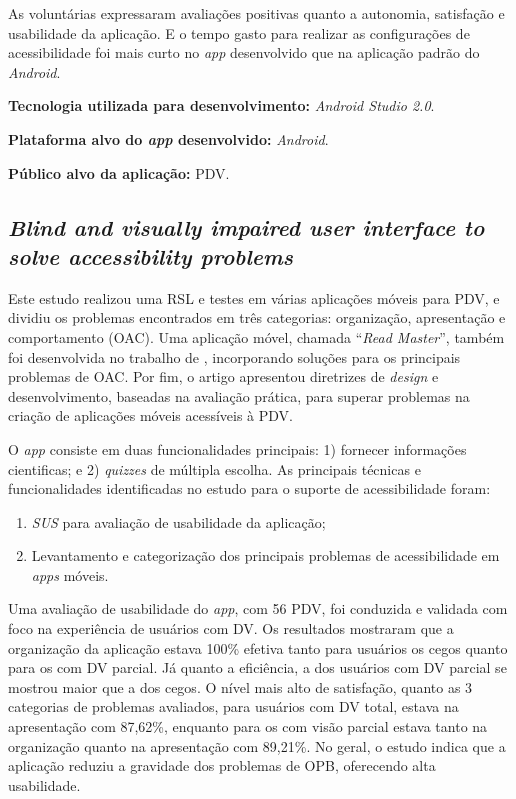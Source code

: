 As voluntárias expressaram avaliações positivas quanto a autonomia, satisfação e usabilidade da aplicação.
E o tempo gasto para realizar as configurações de acessibilidade foi mais curto no \emph{app} desenvolvido que na aplicação padrão do \emph{Android}.

\textbf{Tecnologia utilizada para desenvolvimento:} \emph{Android Studio 2.0}.

\textbf{Plataforma alvo do \emph{app} desenvolvido:} \emph{Android}.

\textbf{Público alvo da aplicação:} PDV\@.

\subsection{\emph{Blind and visually impaired user interface to solve accessibility problems}}

Este estudo realizou uma RSL e testes em várias aplicações móveis para PDV, e dividiu os problemas encontrados em três categorias: organização, apresentação e comportamento (OAC).
Uma aplicação móvel, chamada ``\emph{Read Master}'', também foi desenvolvida no trabalho de , incorporando soluções para os principais problemas de OAC.
Por fim, o artigo apresentou diretrizes de \emph{design} e desenvolvimento, baseadas na avaliação prática, para superar problemas na criação de aplicações móveis acessíveis à PDV.

O \emph{app} consiste em duas funcionalidades principais: 1) fornecer informações cientificas; e 2) \emph{quizzes} de múltipla escolha.
As principais técnicas e funcionalidades identificadas no estudo para o suporte de acessibilidade foram:

\begin{enumerate}
\item \emph{SUS} para avaliação de usabilidade da aplicação;
\item Levantamento e categorização dos principais problemas de acessibilidade em \emph{apps} móveis.
\end{enumerate}

Uma avaliação de usabilidade do \emph{app}, com 56 PDV, foi conduzida e validada com foco na experiência de usuários com DV.
Os resultados mostraram que a organização da aplicação estava 100\% efetiva tanto para usuários os cegos quanto para os com DV parcial.
Já quanto a eficiência, a dos usuários com DV parcial se mostrou maior que a dos cegos.
O nível mais alto de satisfação, quanto as 3 categorias de problemas avaliados, para usuários com DV total, estava na apresentação com 87,62\%, enquanto para os com visão parcial estava tanto na organização quanto na apresentação com 89,21\%.
No geral, o estudo indica que a aplicação reduziu a gravidade dos problemas de OPB, oferecendo alta usabilidade.

